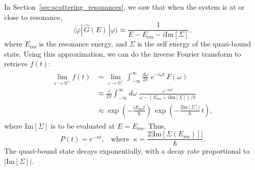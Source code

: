 \documentclass[pra,12pt]{revtex4}
\begin{document}
In Section~\ref{sec:scattering_resonances}, we saw that when the
system is at or close to resonance,
\begin{equation}
  \langle\varphi|\,\hat{G}(E)\,|\varphi\rangle \approx \frac{1}{\displaystyle E - E_{\mathrm{res}} - i \mathrm{Im}[\Sigma]},
\end{equation}
where $E_{\mathrm{res}}$ is the resonance energy, and $\Sigma$ is the
self energy of the quasi-bound state.  Using this approximation, we
can do the inverse Fourier transform to retrieve $f(t)$:
\begin{align}
  \begin{aligned} \lim_{\varepsilon\rightarrow 0^+} f(t) &= \lim_{\varepsilon\rightarrow 0^+} \int_{-\infty}^{\infty} \frac{d\omega}{2\pi} \; e^{-i\omega t} \, F(\omega) \\
    &\approx \frac{i}{2\pi} \int_{-\infty}^{\infty} d\omega\; \frac{e^{-i\omega t}}{\omega - (E_{\mathrm{res}}+i \mathrm{Im}[\Sigma])/\hbar} \\
    &\approx \exp\left(-\frac{iE_{\mathrm{res}}t}{\hbar}\right)\, \exp\left(-\frac{|\mathrm{Im}[\Sigma]|}{\hbar}\,t\right),
  \end{aligned}
\end{align}
where $\mathrm{Im}[\Sigma]$ is to be evaluated at $E =
E_{\mathrm{res}}$.  Thus,
\begin{equation}
  P(t) = e^{-\kappa t}, \;\;\;\mathrm{where}\;\;\kappa
  = \frac{2\big|\mathrm{Im}[\Sigma(E_{\mathrm{res}})]\big|}{\hbar}.
  \label{Ptresult}
\end{equation}
The quasi-bound state decays exponentially, with a decay rate
proportional to $|\mathrm{Im}[\Sigma]|$.
\end{document}
